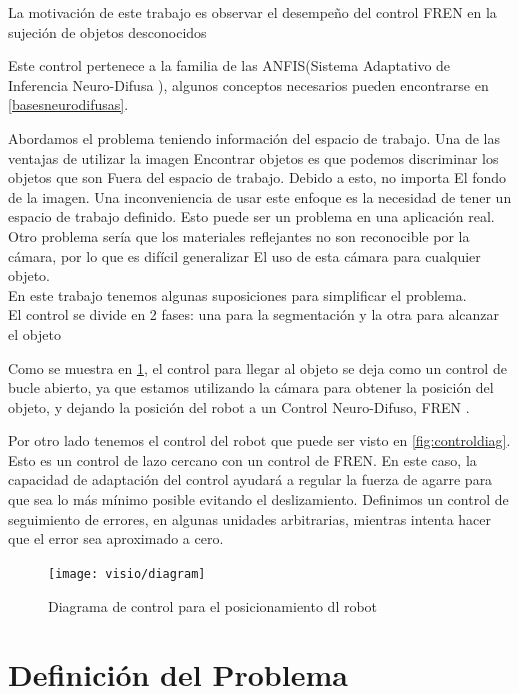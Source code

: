  
La motivación de este trabajo es observar el desempeño del control FREN en la sujeción de objetos desconocidos

Este control pertenece a la familia de las ANFIS(Sistema Adaptativo de Inferencia Neuro-Difusa ), algunos conceptos necesarios pueden encontrarse en \cref{basesneurodifusas}.



Abordamos el problema teniendo información del espacio de trabajo. Una de las ventajas de utilizar la imagen
Encontrar objetos es que podemos discriminar los objetos que son
Fuera del espacio de trabajo. Debido a esto, no importa
El fondo de la imagen.
Una inconveniencia de usar este enfoque es la necesidad de tener un espacio de trabajo definido. Esto puede ser un problema en una aplicación real. Otro problema sería que los materiales reflejantes no son reconocible por la cámara, por lo que es difícil generalizar
El uso de esta cámara para cualquier objeto. \\
En este trabajo tenemos algunas suposiciones para simplificar el problema. \\



El control se divide en 2 fases: una para la segmentación y la otra para alcanzar el objeto

Como se muestra en \cref{fig:1}, el control para llegar al objeto se deja como un control de bucle abierto, ya que estamos utilizando la cámara para obtener la posición del objeto, y dejando la posición del robot a un Control Neuro-Difuso, FREN \cite{fren}.

Por otro lado tenemos el control del robot que puede ser visto en \cref{fig:controldiag}. Esto es un control de lazo cercano con un control de FREN. En este caso, la capacidad de adaptación del control ayudará a regular la fuerza de agarre para que sea lo más mínimo posible evitando el deslizamiento.
Definimos un control de seguimiento de errores, en algunas unidades arbitrarias, mientras intenta hacer que el error sea aproximado a cero.%


\begin{figure}[h]%
	\centering
	\texttt{[image: visio/diagram]}
	\caption{Diagrama de control para el posicionamiento dl robot}
	\label{fig:1}
\end{figure}


\section{Definición del Problema}




